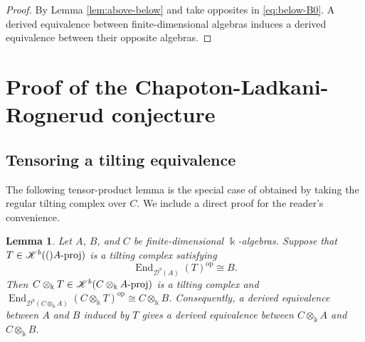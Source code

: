 \documentclass[12pt,a4paper,english,reqno]{amsart}
\theoremstyle{plain}
\newtheorem{lemma}[theorem]{Lemma}
\theoremstyle{definition}
\newcommand{\kk}{\Bbbk}
\newcommand{\End}{\operatorname{End}}
\newcommand{\op}{\mathrm{op}}
\newcommand{\Db}[1]{{\mathscr D}^b(#1)}
\newcommand{\pmodcat}[1]{#1\mbox{{\rm -proj}}}
\newcommand{\Kb}[1]{{\mathscr K}^b(#1)}
\begin{document}
\begin{proof}
 By Lemma \ref{lem:above-below} and take opposites in \eqref{eq:below-B0}. A derived equivalence between finite-dimensional
algebras induces a derived equivalence between their opposite algebras.
\end{proof}


\section{Proof of the Chapoton-Ladkani-Rognerud conjecture}
\label{sec:conjecture}

\subsection{Tensoring a tilting equivalence}

The following tensor-product lemma is the special case of
\cite[Theorem~2.1]{Rickard1991} obtained by taking the regular
tilting complex over $C$.  We include a direct proof for the
reader's convenience.

\begin{lemma}
\label{lem:tensor-tilting}
Let $A$, $B$, and $C$ be finite-dimensional $\kk$-algebras.  Suppose that
$T\in \Kb(\pmodcat{A})$ is a tilting complex satisfying
\[
 \End_{\Db{A}}(T)^{\op}\cong B.
\]
Then $C\otimes_{\kk}T\in \Kb{\pmodcat{C\otimes_{\kk}A}}$
is a tilting complex and
$\End_{\Db{C\otimes_{\kk}A}}(C\otimes_{\kk}T)^{\op}
 \cong C\otimes_{\kk}B$.
Consequently, a derived equivalence between $A$ and $B$ induced by $T$
gives a derived equivalence between
$C\otimes_{\kk}A$ and $C\otimes_{\kk}B$.
\end{lemma}
\end{document}
